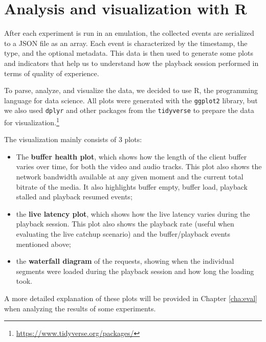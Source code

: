\section{Analysis and visualization with R}
\label{sec:testbed/dataviz}

After each experiment is run in an emulation, the collected events are serialized to a JSON file as an array. Each event is characterized by the timestamp, the type, and the optional metadata. This data is then used to generate some plots and indicators that help us to understand how the playback session performed in terms of quality of experience.

To parse, analyze, and visualize the data, we decided to use R, the programming language for data science. All plots were generated with the \texttt{ggplot2} library, but we also used \texttt{dplyr} and other packages from the \texttt{tidyverse} to prepare the data for visualization.\footnote{\url{https://www.tidyverse.org/packages/}}

The visualization mainly consists of 3 plots:

\begin{itemize}
    \item The \textbf{buffer health plot}, which shows how the length of the client buffer varies over time, for both the video and audio tracks. This plot also shows the network bandwidth available at any given moment and the current total bitrate of the media. It also highlights buffer empty, buffer load, playback stalled and playback resumed events;
    \item the \textbf{live latency plot}, which shows how the live latency varies during the playback session. This plot also shows the playback rate (useful when evaluating the live catchup scenario) and the buffer/playback events mentioned above;
    \item the \textbf{waterfall diagram} of the requests, showing when the individual segments were loaded during the playback session and how long the loading took.
\end{itemize}

A more detailed explanation of these plots will be provided in Chapter \ref{cha:eval} when analyzing the results of some experiments.

